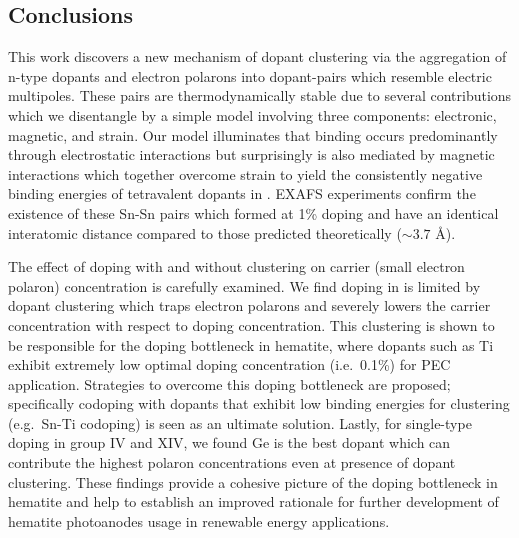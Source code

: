 \subsection{Conclusions}
This work discovers a new mechanism of dopant clustering via the aggregation of n-type dopants and electron polarons into dopant-pairs %
which resemble electric multipoles.
These pairs are thermodynamically stable due to several contributions %
which we disentangle by a simple model involving three components: electronic, magnetic, and strain. Our model illuminates that binding occurs predominantly through electrostatic interactions but surprisingly is also mediated by magnetic interactions which together overcome strain to yield the consistently negative binding energies of tetravalent dopants in . EXAFS experiments confirm the existence of these Sn-Sn pairs which formed at 1\% doping and have an identical interatomic distance compared to those predicted theoretically  ($\sim3.7$ {\AA}).

The effect of doping with and without clustering on carrier (small electron polaron) concentration is carefully examined.
We find doping in  is limited by dopant clustering which traps electron polarons and severely lowers the carrier concentration with respect to doping concentration. This clustering is shown to be responsible for the doping bottleneck in hematite, where dopants such as Ti exhibit extremely low optimal doping concentration (i.e.\ 0.1\%) for PEC application.
Strategies to overcome this doping bottleneck are proposed; specifically codoping with dopants that exhibit low binding energies for clustering (e.g.\ Sn-Ti codoping) is seen as an ultimate solution.
Lastly, for single-type doping in group IV and XIV, we found Ge is the best dopant which can contribute the highest polaron concentrations even at presence of dopant clustering.
These findings provide a cohesive picture of the doping bottleneck in hematite and help to establish an improved rationale for further development of hematite photoanodes usage in renewable energy applications.
